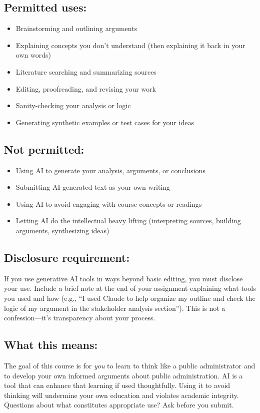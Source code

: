 \documentclass[12pt]{article}
\begin{document}
\subsection*{Permitted uses:}
\begin{itemize}
\item Brainstorming and outlining arguments
\item Explaining concepts you don't understand (then explaining it back in your own words)
\item Literature searching and summarizing sources
\item Editing, proofreading, and revising your work
\item Sanity-checking your analysis or logic
\item Generating synthetic examples or test cases for your ideas
\end{itemize}

\subsection*{Not permitted:}
\begin{itemize}
\item Using AI to generate your analysis, arguments, or conclusions
\item Submitting AI-generated text as your own writing
\item Using AI to avoid engaging with course concepts or readings
\item Letting AI do the intellectual heavy lifting (interpreting sources, building arguments, synthesizing ideas)
\end{itemize}

\subsection*{Disclosure requirement:}
If you use generative AI tools in ways beyond basic editing, you must disclose your use. Include a brief note at the end of your assignment explaining what tools you used and how (e.g., ``I used Claude to help organize my outline and check the logic of my argument in the stakeholder analysis section''). This is not a confession---it's transparency about your process.

\subsection*{What this means:}
The goal of this course is for \emph{you} to learn to think like a public administrator and to develop your own informed arguments about public administration. AI is a tool that can enhance that learning if used thoughtfully. Using it to avoid thinking will undermine your own education and violates academic integrity. Questions about what constitutes appropriate use? Ask before you submit.
\end{document}
